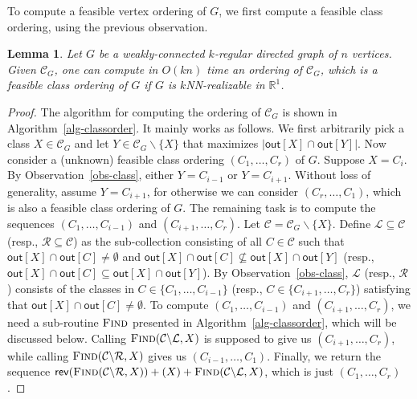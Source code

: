 \documentclass[11pt]{article}
\newtheorem{lemma}{Lemma}
\begin{document}
To compute a feasible vertex ordering of $G$, we first compute a feasible class ordering, using the previous observation.
\begin{lemma} \label{lem-classorder}
    Let $G$ be a weakly-connected $k$-regular directed graph of $n$ vertices.
    Given $\mathcal{C}_G$, one can compute in $O(kn)$ time an ordering of $\mathcal{C}_G$, which is a feasible class ordering of $G$ if $G$ is $k$NN-realizable in $\mathbb{R}^1$.
\end{lemma}

\begin{proof}
The algorithm for computing the ordering of $\mathcal{C}_G$ is shown in Algorithm~\ref{alg-classorder}.
It mainly works as follows.
We first arbitrarily pick a class $X \in \mathcal{C}_G$ and let $Y \in \mathcal{C}_G \backslash \{X\}$ that maximizes $|\mathsf{out}[X] \cap \mathsf{out}[Y]|$.
Now consider a (unknown) feasible class ordering $(C_1,\dots,C_r)$ of $G$.
Suppose $X = C_i$.
By Observation~\ref{obs-class}, either $Y = C_{i-1}$ or $Y = C_{i+1}$.
Without loss of generality, assume $Y = C_{i+1}$, for otherwise we can consider $(C_r,\dots,C_1)$, which is also a feasible class ordering of $G$.
The remaining task is to compute the sequences $(C_1,\dots,C_{i-1})$ and $(C_{i+1},\dots,C_r)$.
Let $\mathcal{C} = \mathcal{C}_G \backslash \{X\}$.
Define $\mathcal{L} \subseteq \mathcal{C}$ (resp., $\mathcal{R} \subseteq \mathcal{C}$) as the sub-collection consisting of all $C \in \mathcal{C}$ such that $\mathsf{out}[X] \cap \mathsf{out}[C] \neq \emptyset$ and $\mathsf{out}[X] \cap \mathsf{out}[C] \nsubseteq \mathsf{out}[X] \cap \mathsf{out}[Y]$ (resp., $\mathsf{out}[X] \cap \mathsf{out}[C] \subseteq \mathsf{out}[X] \cap \mathsf{out}[Y]$).
By Observation~\ref{obs-class}, $\mathcal{L}$ (resp., $\mathcal{R}$) consists of the classes in $C \in \{C_1,\dots,C_{i-1}\}$ (resp., $C \in \{C_{i+1},\dots,C_r\}$) satisfying that $\mathsf{out}[X] \cap \mathsf{out}[C] \neq \emptyset$.
To compute $(C_1,\dots,C_{i-1})$ and $(C_{i+1},\dots,C_r)$, we need a sub-routine $\textsc{Find}$ presented in Algorithm~\ref{alg-classorder}, which will be discussed below.
Calling $\textsc{Find}(\mathcal{C} \backslash \mathcal{L},X)$ is supposed to give us $(C_{i+1},\dots,C_r)$, while calling $\textsc{Find}(\mathcal{C} \backslash \mathcal{R},X)$ gives us $(C_{i-1},\dots,C_1)$.
Finally, we return the sequence $\mathsf{rev}(\textsc{Find}(\mathcal{C} \backslash \mathcal{R},X)) + (X) + \textsc{Find}(\mathcal{C} \backslash \mathcal{L},X)$, which is just $(C_1,\dots,C_r)$.

\end{proof}
\end{document}
